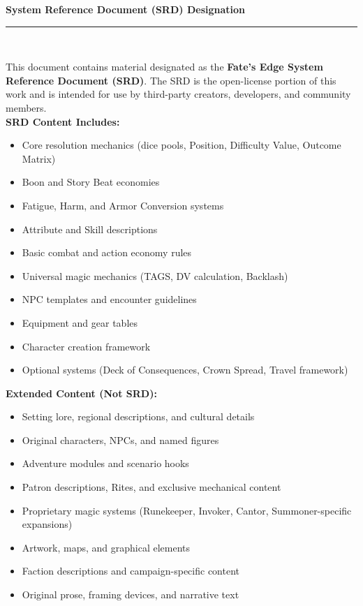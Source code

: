 \begin{center}
    \vspace{0.2in}
  {\Large\textbf{System Reference Document (SRD) Designation}}\\[0.3in]

  \rule{0.7\textwidth}{0.4pt}\\[0.3in]

  \begin{minipage}{0.85\textwidth}
    \small
    This document contains material designated as the \textbf{Fate's Edge System Reference Document (SRD)}.
    The SRD is the open-license portion of this work and is intended for use by third-party creators,
    developers, and community members.\\[0.2in]

    \textbf{SRD Content Includes:}
    \begin{itemize}
      \item Core resolution mechanics (dice pools, Position, Difficulty Value, Outcome Matrix)
      \item Boon and Story Beat economies
      \item Fatigue, Harm, and Armor Conversion systems
      \item Attribute and Skill descriptions
      \item Basic combat and action economy rules
      \item Universal magic mechanics (TAGS, DV calculation, Backlash)
      \item NPC templates and encounter guidelines
      \item Equipment and gear tables
      \item Character creation framework
      \item Optional systems (Deck of Consequences, Crown Spread, Travel framework)
    \end{itemize}

    \vspace{0.2in}

    \textbf{Extended Content (Not SRD):}
    \begin{itemize}
      \item Setting lore, regional descriptions, and cultural details
      \item Original characters, NPCs, and named figures
      \item Adventure modules and scenario hooks
      \item Patron descriptions, Rites, and exclusive mechanical content
      \item Proprietary magic systems (Runekeeper, Invoker, Cantor, Summoner-specific expansions)
      \item Artwork, maps, and graphical elements
      \item Faction descriptions and campaign-specific content
      \item Original prose, framing devices, and narrative text
    \end{itemize}


\end{minipage}
\end{center}
